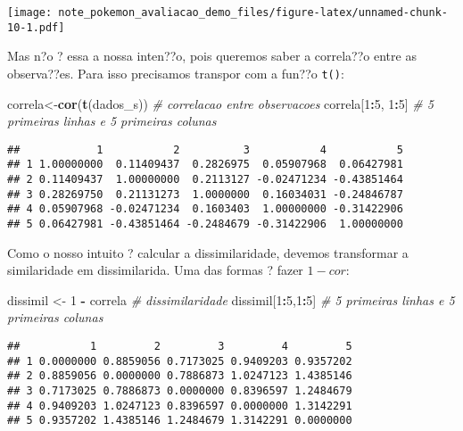 \documentclass[]{article}
\newenvironment{Shaded}{\begin{snugshade}}{\end{snugshade}}
\newcommand{\CommentTok}[1]{\textcolor[rgb]{0.56,0.35,0.01}{\textit{#1}}}
\newcommand{\DecValTok}[1]{\textcolor[rgb]{0.00,0.00,0.81}{#1}}
\newcommand{\KeywordTok}[1]{\textcolor[rgb]{0.13,0.29,0.53}{\textbf{#1}}}
\newcommand{\NormalTok}[1]{#1}
\newcommand{\OperatorTok}[1]{\textcolor[rgb]{0.81,0.36,0.00}{\textbf{#1}}}
\newcommand{\StringTok}[1]{\textcolor[rgb]{0.31,0.60,0.02}{#1}}
\begin{document}
\texttt{[image: note\_pokemon\_avaliacao\_demo\_files/figure-latex/unnamed-chunk-10-1.pdf]}

Mas n?o ? essa a nossa inten??o, pois queremos saber a correla??o entre
as observa??es. Para isso precisamos transpor com a fun??o \texttt{t()}:

\begin{Shaded}
\begin{Highlighting}[]
\NormalTok{correla<-}\KeywordTok{cor}\NormalTok{(}\KeywordTok{t}\NormalTok{(dados_s)) }\CommentTok{# correlacao entre observacoes}
\NormalTok{correla[}\DecValTok{1}\OperatorTok{:}\DecValTok{5}\NormalTok{, }\DecValTok{1}\OperatorTok{:}\DecValTok{5}\NormalTok{] }\CommentTok{# 5 primeiras linhas e 5 primeiras colunas}
\end{Highlighting}
\end{Shaded}

\begin{verbatim}
##            1           2          3           4           5
## 1 1.00000000  0.11409437  0.2826975  0.05907968  0.06427981
## 2 0.11409437  1.00000000  0.2113127 -0.02471234 -0.43851464
## 3 0.28269750  0.21131273  1.0000000  0.16034031 -0.24846787
## 4 0.05907968 -0.02471234  0.1603403  1.00000000 -0.31422906
## 5 0.06427981 -0.43851464 -0.2484679 -0.31422906  1.00000000
\end{verbatim}

Como o nosso intuito ? calcular a dissimilaridade, devemos transformar a
similaridade em dissimilarida. Uma das formas ? fazer \(1 - cor\):

\begin{Shaded}
\begin{Highlighting}[]
\NormalTok{dissimil <-}\StringTok{ }\DecValTok{1} \OperatorTok{-}\StringTok{ }\NormalTok{correla }\CommentTok{# dissimilaridade}
\NormalTok{dissimil[}\DecValTok{1}\OperatorTok{:}\DecValTok{5}\NormalTok{,}\DecValTok{1}\OperatorTok{:}\DecValTok{5}\NormalTok{] }\CommentTok{# 5 primeiras linhas e 5 primeiras colunas}
\end{Highlighting}
\end{Shaded}

\begin{verbatim}
##           1         2         3         4         5
## 1 0.0000000 0.8859056 0.7173025 0.9409203 0.9357202
## 2 0.8859056 0.0000000 0.7886873 1.0247123 1.4385146
## 3 0.7173025 0.7886873 0.0000000 0.8396597 1.2484679
## 4 0.9409203 1.0247123 0.8396597 0.0000000 1.3142291
## 5 0.9357202 1.4385146 1.2484679 1.3142291 0.0000000
\end{verbatim}
\end{document}
